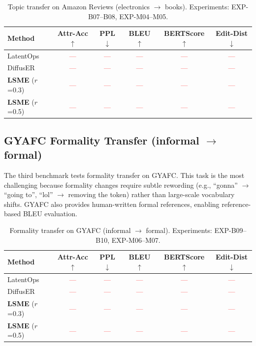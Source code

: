\documentclass{article}
\newcommand{\tbd}[1]{\textcolor{red}{#1}}  %
\begin{document}
\begin{table}[h]
\centering
\caption{Topic transfer on Amazon Reviews (electronics $\to$ books). Experiments: EXP-B07--B08, EXP-M04--M05.}
\label{tab:amazon_results}
\begin{tabular}{lccccc}
\toprule
\textbf{Method} & \textbf{Attr-Acc $\uparrow$} & \textbf{PPL $\downarrow$} & \textbf{BLEU $\uparrow$} & \textbf{BERTScore $\uparrow$} & \textbf{Edit-Dist $\downarrow$} \\
\midrule
LatentOps & \tbd{---} & \tbd{---} & \tbd{---} & \tbd{---} & \tbd{---} \\
DiffusER & \tbd{---} & \tbd{---} & \tbd{---} & \tbd{---} & \tbd{---} \\
\midrule
\textbf{LSME} ($r$=0.3) & \tbd{---} & \tbd{---} & \tbd{---} & \tbd{---} & \tbd{---} \\
\textbf{LSME} ($r$=0.5) & \tbd{---} & \tbd{---} & \tbd{---} & \tbd{---} & \tbd{---} \\
\bottomrule
\end{tabular}
\end{table}

\subsection{GYAFC Formality Transfer (\texorpdfstring{informal $\to$ formal}{informal to formal})}

The third benchmark tests formality transfer on GYAFC. This task is the most challenging because formality changes require subtle rewording (e.g., ``gonna'' $\to$ ``going to'', ``lol'' $\to$ removing the token) rather than large-scale vocabulary shifts. GYAFC also provides human-written formal references, enabling reference-based BLEU evaluation.

\begin{table}[h]
\centering
\caption{Formality transfer on GYAFC (informal $\to$ formal). Experiments: EXP-B09--B10, EXP-M06--M07.}
\label{tab:gyafc_results}
\begin{tabular}{lccccc}
\toprule
\textbf{Method} & \textbf{Attr-Acc $\uparrow$} & \textbf{PPL $\downarrow$} & \textbf{BLEU $\uparrow$} & \textbf{BERTScore $\uparrow$} & \textbf{Edit-Dist $\downarrow$} \\
\midrule
LatentOps & \tbd{---} & \tbd{---} & \tbd{---} & \tbd{---} & \tbd{---} \\
DiffusER & \tbd{---} & \tbd{---} & \tbd{---} & \tbd{---} & \tbd{---} \\
\midrule
\textbf{LSME} ($r$=0.3) & \tbd{---} & \tbd{---} & \tbd{---} & \tbd{---} & \tbd{---} \\
\textbf{LSME} ($r$=0.5) & \tbd{---} & \tbd{---} & \tbd{---} & \tbd{---} & \tbd{---} \\
\bottomrule
\end{tabular}
\end{table}
\end{document}
